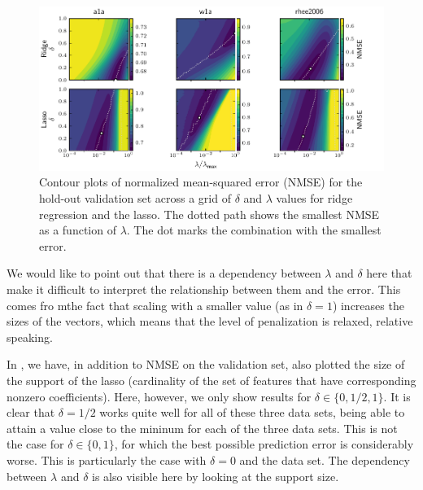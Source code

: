 \begin{figure}[htpb]
  \centering
  \includegraphics[]{plots/hyperopt_surfaces.pdf}
  \caption{%
    Contour plots of normalized mean-squared error (NMSE) for the hold-out validation set
    across a grid of \(\delta\) and \(\lambda\) values for ridge regression and the lasso. The
    dotted path shows the smallest NMSE as a function of \(\lambda\). The dot marks the
    combination with the smallest error. } \label{fig:hyperopt-contours}
\end{figure}

We would like to point out that there is a dependency between \(\lambda\) and \(\delta\)
here that make it difficult to interpret the relationship between them and the error. This
comes fro mthe fact that scaling with a smaller value (as in \(\delta = 1\)) increases the
sizes of the vectors, which means that the level of penalization is relaxed, relative
speaking.

In , we have, in addition to NMSE on the validation set, also
plotted the size of the support of the lasso (cardinality of the set of features that have
corresponding nonzero coefficients). Here, however, we only show results for \(\delta \in
\{0, 1/2, 1\}\). It is clear that \(\delta = 1/2\) works quite well for all of these three
data sets, being able to attain a value close to the mininum for each of the three data
sets. This is not the case for \(\delta \in \{0, 1\}\), for which the best possible
prediction error is considerably worse. This is particularly the case with \(\delta =0\)
and the  data set. The dependency between \(\lambda\) and \(\delta\) is also
visible here by looking at the support size.

